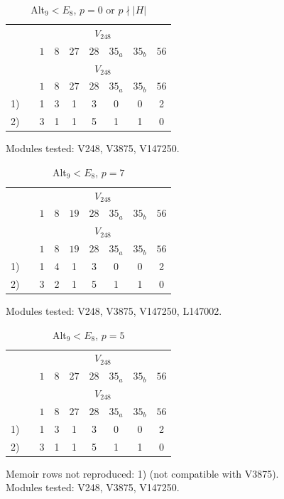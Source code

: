 \setcounter{table}{237}
\begin{longtable}{rc|ccccccc}
\caption{Alt$_9 < E_8$, $p = 0$ or $p \nmid |H|$}\\
& & \multicolumn{7}{c}{$V_{248}$} \\
& & $1$ & $8$ & $27$ & $28$ & $35_{a}$ & $35_{b}$ & $56$ \\ \hline
\endfirsthead
& & \multicolumn{7}{c}{$V_{248}$} \\
& & $1$ & $8$ & $27$ & $28$ & $35_{a}$ & $35_{b}$ & $56$ \\ \hline
\endhead
1) &  & 1 & 3 & 1 & 3 & 0 & 0 & 2 \\
2) &  & 3 & 1 & 1 & 5 & 1 & 1 & 0 \\
\end{longtable}
\noindent Modules tested: V248, V3875, V147250.\\

\setcounter{table}{238}
\begin{longtable}{rc|ccccccc}
\caption{Alt$_9 < E_8$, $p = 7$}\\
& & \multicolumn{7}{c}{$V_{248}$} \\
& & $1$ & $8$ & $19$ & $28$ & $35_{a}$ & $35_{b}$ & $56$ \\ \hline
\endfirsthead
& & \multicolumn{7}{c}{$V_{248}$} \\
& & $1$ & $8$ & $19$ & $28$ & $35_{a}$ & $35_{b}$ & $56$ \\ \hline
\endhead
1) &  & 1 & 4 & 1 & 3 & 0 & 0 & 2 \\
2) &  & 3 & 2 & 1 & 5 & 1 & 1 & 0 \\
\end{longtable}
\noindent Modules tested: V248, V3875, V147250, L147002.\\

\setcounter{table}{239}
\begin{longtable}{rc|ccccccc}
\caption{Alt$_9 < E_8$, $p = 5$}\\
& & \multicolumn{7}{c}{$V_{248}$} \\
& & $1$ & $8$ & $27$ & $28$ & $35_{a}$ & $35_{b}$ & $56$ \\ \hline
\endfirsthead
& & \multicolumn{7}{c}{$V_{248}$} \\
& & $1$ & $8$ & $27$ & $28$ & $35_{a}$ & $35_{b}$ & $56$ \\ \hline
\endhead
1) &  & 1 & 3 & 1 & 3 & 0 & 0 & 2 \\
2) &  & 3 & 1 & 1 & 5 & 1 & 1 & 0 \\
\end{longtable}
\noindent Memoir rows not reproduced: 1) (not compatible with V3875).\\
Modules tested: V248, V3875, V147250.\\

